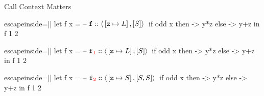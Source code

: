 \documentclass{haskellbeamer}
\begin{document}
\begin{frame}[fragile]{Call Context Matters}
\begin{overprint}
\begin{center}
\begin{minipage}{0.7\textwidth}
      \end{minipage}
    \end{center}
    \begin{center}
      \begin{minipage}{0.7\textwidth}
        \begin{haskell*}{escapeinside=||}
          let f x = -- $\mathtt{f} :: \left\langle{}\left[\mathtt{z}\mapsto L\right],[S]\right\rangle{}$
                if odd x
                  then \y -> y*z
                  else \y -> y+z
          in f 1 2
        \end{haskell*}
      \end{minipage}
    \end{center}
    \begin{center}
      \begin{minipage}{0.7\textwidth}
        \begin{haskell*}{escapeinside=||}
          let f x = -- $\mathtt{f}_{\color{red}1} :: \left\langle{}\left[\mathtt{z}\mapsto L\right],[S]\right\rangle{}$
                if odd x
                  then \y -> y*z
                  else \y -> y+z
          in f 1 2
        \end{haskell*}
      \end{minipage}
    \end{center}
    \begin{center}
      \begin{minipage}{0.7\textwidth}
        \begin{haskell*}{escapeinside=||}
          let f x = -- $\mathtt{f}_{\color{red}2} :: \left\langle{}\left[\mathtt{z}\mapsto S\right],[S,S]\right\rangle{}$
                if odd x
                  then \y -> y*z
                  else \y -> y+z
          in f 1 2
        \end{haskell*}
      \end{minipage}
    \end{center}
  \end{overprint}
\end{frame}
  
\end{document}
